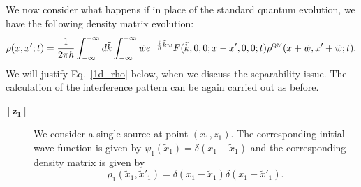\documentclass[12pt,groupedaddress,pra,aps]{revtex4-1}
\begin{document}
We now consider what happens if in place of the standard quantum evolution, we have the following density matrix evolution:
\begin{equation}\label{1d_rho}
\rho(x,x';t)=\frac{1}{2\pi\hbar} \int_{-\infty}^{+\infty} d\tilde{k}  \int_{-\infty}^{+\infty} \tilde{w} e^{-\frac{i}{\hbar}\tilde{k} \tilde{w}}
F(\tilde{k},0,0;x-x',0,0;t) \rho^{\text{\tiny QM}}(x+\tilde{w},x'+\tilde{w};t).
\end{equation}
We will justify Eq.~\eqref{1d_rho} below, when we discuss the separability issue. The calculation of the interference pattern can be again carried out as before.
\begin{description}
\item[$\boldsymbol{[z_1]}$] We  consider a single source at point $(x_1, z_1)$. The corresponding initial wave function is given by $\psi_1(\tilde{x}_1)=\delta(x_1-\tilde{x}_1)$ and the corresponding density matrix is given by 
\begin{equation}\label{grwdp1}
\rho_1(\tilde{x}_1,\tilde{x}'_1)=\delta(x_1-\tilde{x}_1)\delta(x_1-\tilde{x}'_1).
\end{equation}


\end{description}
\end{document}
